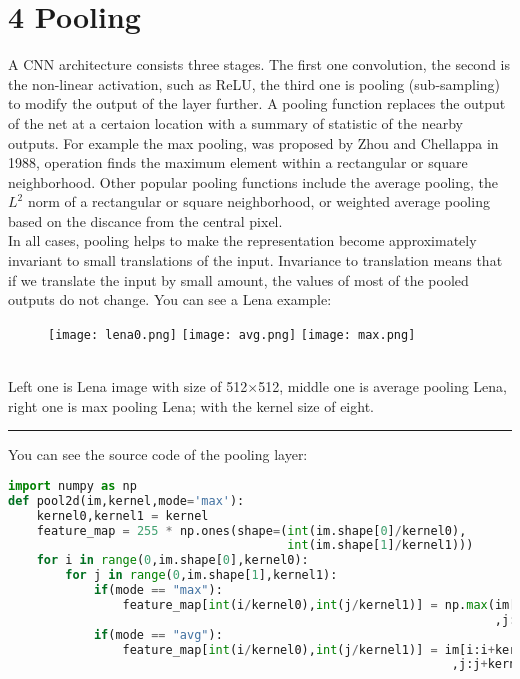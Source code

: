 \documentclass[11pt]{article}
\begin{document}
\section{4 Pooling}
\hspace*{1cm} A CNN architecture consists three stages. The first one convolution, the second is the non-linear activation, such as ReLU, the third one is pooling (sub-sampling) to modify the output of the layer further. A pooling function replaces the output of the net at a certaion location with a summary of statistic of the nearby outputs. For example the max pooling, was proposed by Zhou and Chellappa in 1988, operation finds the maximum element within a rectangular or square neighborhood. Other popular pooling functions include the average pooling, the $L^2$ norm of a rectangular or square neighborhood, or weighted average pooling based on the discance from the central pixel.\cite{GoodBengCour16}\\
In all cases, pooling helps to make the representation become approximately invariant to small translations of the input. Invariance to translation means that if we translate the input by small amount, the values of most of the pooled outputs do not change. You can see a Lena example:
\begin{figure}[htp]

\centering
\texttt{[image: lena0.png]}\hfill
\texttt{[image: avg.png]}\hfill
\texttt{[image: max.png]}

\caption{}
\label{fig:x}
\end{figure}\\
Left one is Lena image with size of 512$\times$512, middle one is average pooling Lena, right one is max pooling Lena; with the kernel size of eight.
\\
\par\noindent\rule{\textwidth}{0.5pt}
You can see the source code of the pooling layer:\\
\begin{lstlisting}[language=Python,basicstyle=\tiny]
import numpy as np
def pool2d(im,kernel,mode='max'):
    kernel0,kernel1 = kernel
    feature_map = 255 * np.ones(shape=(int(im.shape[0]/kernel0),
                                       int(im.shape[1]/kernel1)))
    for i in range(0,im.shape[0],kernel0):
        for j in range(0,im.shape[1],kernel1):
            if(mode == "max"):
                feature_map[int(i/kernel0),int(j/kernel1)] = np.max(im[i:i+kernel0
                                                                    ,j:j+kernel1])
            if(mode == "avg"):
                feature_map[int(i/kernel0),int(j/kernel1)] = im[i:i+kernel0
                                                              ,j:j+kernel1].mean()
\end{lstlisting}
\end{document}
